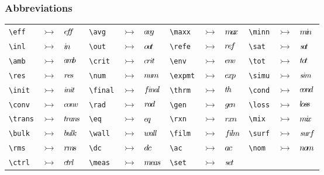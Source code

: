     \subsubsection{Abbreviations}
        \begin{center}
        \begin{tabular}{lll|lll|lll|lll}
            \verb|\eff|   & $\rightarrowtail$ & $\eff$   &
            \verb|\avg|   & $\rightarrowtail$ & $\avg$   &
            \verb|\maxx|  & $\rightarrowtail$ & $\maxx$  &
            \verb|\minn|  & $\rightarrowtail$ & $\minn$  \\
            \verb|\inl|   & $\rightarrowtail$ & $\inl$   &
            \verb|\out|   & $\rightarrowtail$ & $\out$   &
            \verb|\refe|  & $\rightarrowtail$ & $\refe$  &
            \verb|\sat|   & $\rightarrowtail$ & $\sat$   \\
            \verb|\amb|   & $\rightarrowtail$ & $\amb$   &
            \verb|\crit|  & $\rightarrowtail$ & $\crit$  &
            \verb|\env|   & $\rightarrowtail$ & $\env$   &
            \verb|\tot|   & $\rightarrowtail$ & $\tot$   \\
            \verb|\res|   & $\rightarrowtail$ & $\res$   &
            \verb|\num|   & $\rightarrowtail$ & $\numer$   &
            \verb|\expmt| & $\rightarrowtail$ & $\expmt$ &
            \verb|\simu|  & $\rightarrowtail$ & $\simu$  \\
            \verb|\init|  & $\rightarrowtail$ & $\init$  &
            \verb|\final| & $\rightarrowtail$ & $\final$ &
            \verb|\thrm|  & $\rightarrowtail$ & $\thrm$  &
            \verb|\cond|  & $\rightarrowtail$ & $\cond$  \\
            \verb|\conv|  & $\rightarrowtail$ & $\conv$  &
            \verb|\rad|   & $\rightarrowtail$ & $\rad$   &
            \verb|\gen|   & $\rightarrowtail$ & $\gen$   &
            \verb|\loss|  & $\rightarrowtail$ & $\loss$  \\
            \verb|\trans| & $\rightarrowtail$ & $\trans$ &
            \verb|\eq|    & $\rightarrowtail$ & $\eq$    &
            \verb|\rxn|   & $\rightarrowtail$ & $\rxn$   &
            \verb|\mix|   & $\rightarrowtail$ & $\mix$   \\
            \verb|\bulk|  & $\rightarrowtail$ & $\bulk$  &
            \verb|\wall|  & $\rightarrowtail$ & $\wall$  &
            \verb|\film|  & $\rightarrowtail$ & $\film$  &
            \verb|\surf|  & $\rightarrowtail$ & $\surf$  \\
            \verb|\rms|   & $\rightarrowtail$ & $\rms$   &
            \verb|\dc|    & $\rightarrowtail$ & $\dc$    &
            \verb|\ac|    & $\rightarrowtail$ & $\ac$    &
            \verb|\nom|   & $\rightarrowtail$ & $\nom$   \\
            \verb|\ctrl|  & $\rightarrowtail$ & $\ctrl$  &
            \verb|\meas|  & $\rightarrowtail$ & $\meas$  &
            \verb|\set|   & $\rightarrowtail$ & $\setp$   &
            &&
        \end{tabular}
        \end{center}

\endgroup